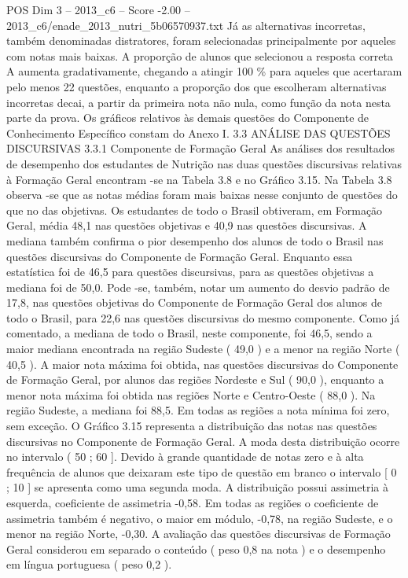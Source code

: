 \begin{textsample}{POS Dim 3 – 2013\_c6 – Score -2.00 – 2013\_c6/enade\_2013\_nutri\_5b06570937.txt}
Já as alternativas incorretas, também denominadas distratores, foram selecionadas principalmente por aqueles com notas mais baixas.
A proporção de alunos que selecionou a resposta correta A aumenta gradativamente, chegando a atingir 100 \% para aqueles que acertaram pelo menos 22 questões, enquanto a proporção dos que escolheram alternativas incorretas decai, a partir da primeira nota não nula, como função da nota nesta parte da prova.
Os gráficos relativos às demais questões do Componente de Conhecimento Específico constam do Anexo I. 3.3 ANÁLISE DAS QUESTÕES DISCURSIVAS 3.3.1 Componente de Formação Geral As análises dos resultados de desempenho dos estudantes de Nutrição nas duas questões discursivas relativas à Formação Geral encontram -se na Tabela 3.8 e no Gráfico 3.15.
Na Tabela 3.8 observa -se que as notas médias foram mais baixas nesse conjunto de questões do que no das objetivas.
Os estudantes de todo o Brasil obtiveram, em Formação Geral, média 48,1 nas questões objetivas e 40,9 nas questões discursivas.
A mediana também confirma o pior desempenho dos alunos de todo o Brasil nas questões discursivas do Componente de Formação Geral.
Enquanto essa estatística foi de 46,5 para questões discursivas, para as questões objetivas a mediana foi de 50,0.
Pode -se, também, notar um aumento do desvio padrão de 17,8, nas questões objetivas do Componente de Formação Geral dos alunos de todo o Brasil, para 22,6 nas questões discursivas do mesmo componente.
Como já comentado, a mediana de todo o Brasil, neste componente, foi 46,5, sendo a maior mediana encontrada na região Sudeste ( 49,0 ) e a menor na região Norte ( 40,5 ).
A maior nota máxima foi obtida, nas questões discursivas do Componente de Formação Geral, por alunos das regiões Nordeste e Sul ( 90,0 ), enquanto a menor nota máxima foi obtida nas regiões Norte e Centro-Oeste ( 88,0 ).
Na região Sudeste, a mediana foi 88,5.
Em todas as regiões a nota mínima foi zero, sem exceção.
O Gráfico 3.15 representa a distribuição das notas nas questões discursivas no Componente de Formação Geral.
A moda desta distribuição ocorre no intervalo ( 50 ; 60 ].
Devido à grande quantidade de notas zero e à alta frequência de alunos que deixaram este tipo de questão em branco o intervalo [ 0 ; 10 ] se apresenta como uma segunda moda.
A distribuição possui assimetria à esquerda, coeficiente de assimetria -0,58.
Em todas as regiões o coeficiente de assimetria também é negativo, o maior em módulo, -0,78, na região Sudeste, e o menor na região Norte, -0,30.
A avaliação das questões discursivas de Formação Geral considerou em separado o conteúdo ( peso 0,8 na nota ) e o desempenho em língua portuguesa ( peso 0,2 ).

\end{textsample}
